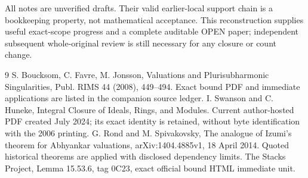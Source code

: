 \documentclass[11pt]{article}
\begin{document}
All notes are unverified drafts. Their valid earlier-local support chain is a bookkeeping property, not mathematical acceptance. This reconstruction supplies useful exact-scope progress and a complete auditable OPEN paper; independent subsequent whole-original review is still necessary for any closure or count change.

\begin{thebibliography}{9}
 S. Boucksom, C. Favre, M. Jonsson, Valuations and Plurisubharmonic Singularities, Publ. RIMS 44 (2008), 449--494. Exact bound PDF and immediate applications are listed in the companion source ledger.
 I. Swanson and C. Huneke, Integral Closure of Ideals, Rings, and Modules. Current author-hosted PDF created July 2024; its exact identity is retained, without byte identification with the 2006 printing.
 G. Rond and M. Spivakovsky, The analogue of Izumi's theorem for Abhyankar valuations, arXiv:1404.4885v1, 18 April 2014. Quoted historical theorems are applied with disclosed dependency limits.
 The Stacks Project, Lemma 15.53.6, tag 0C23, exact official bound HTML immediate unit.
\end{thebibliography}
\end{document}
